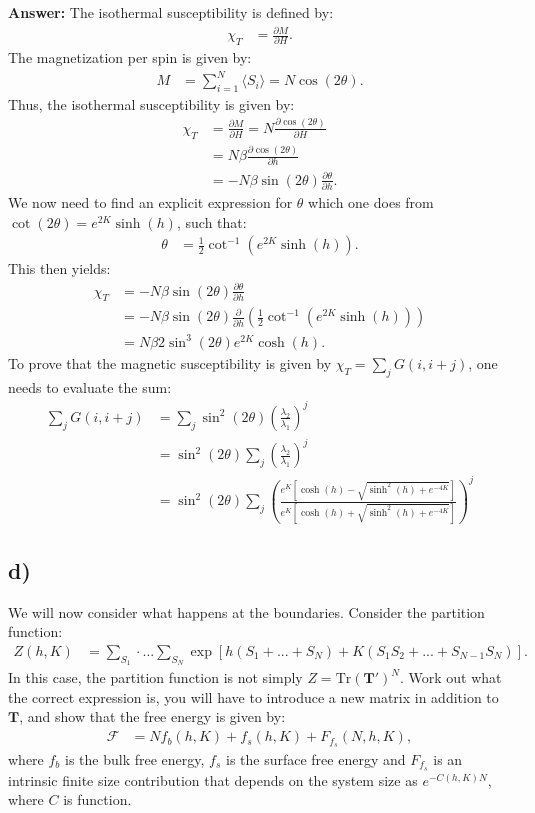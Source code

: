 \documentclass[a4paper]{article}
\newcommand{\trace}{\text{Tr}}
\newcommand{\newparagraph}{\vspace{.5cm}\noindent}
\newcommand{\fpartial}[2]{\frac{\partial #1}{\partial #2}}
\newcommand{\average}[1]{\langle #1 \rangle}
\begin{document}
\newparagraph
\textbf{Answer:} The isothermal susceptibility is defined by:
\begin{align*}
    \chi_T &= \fpartial{M}{H}.
\end{align*}The magnetization per spin is given by:
\begin{align*}
    M &= \sum_{i = 1}^N\average{S_i} = N\cos(2\theta).
\end{align*}Thus, the isothermal susceptibility is given by:
\begin{align*}
    \chi_T &= \fpartial{M}{H} = N\fpartial{\cos(2\theta)}{H}\\
    &= N\beta\fpartial{\cos(2\theta)}{h}\\
    &= -N\beta\sin(2\theta)\fpartial{\theta}{h}.
\end{align*}We now need to find an explicit expression for $\theta$ which one does from $\cot(2\theta) = e^{2K}\sinh(h)$, such that:
\begin{align*}
    \theta &= \frac{1}{2}\cot^{-1}\left(e^{2K}\sinh(h)\right).
\end{align*}This then yields:
\begin{align*}
    \chi_T &=-N\beta\sin(2\theta)\fpartial{\theta}{h}\\
    &= -N\beta\sin\left(2\theta\right)\fpartial{}{h}\left(\frac{1}{2}\cot^{-1}\left(e^{2K}\sinh(h)\right)\right)\\
    &= N\beta2\sin^3\left(2\theta\right)e^{2K}\cosh(h).
\end{align*}
To prove that the magnetic susceptibility is given by $\chi_T = \sum_j G(i, i+j)$, one needs to evaluate the sum:
\begin{align*}
    \sum_j G(i, i+j) &= \sum_j \sin^2\left(2\theta\right)\left(\frac{\lambda_2}{\lambda_1}\right)^j\\
    &= \sin^2\left(2\theta\right)\sum_j\left(\frac{\lambda_2}{\lambda_1}\right)^j\\
    &= \sin^2(2\theta)\sum_j\left(\frac{e^{K}\left[\cosh(h) - \sqrt{\sinh^2(h) + e^{-4K}}\right]}{e^{K}\left[\cosh(h) + \sqrt{\sinh^2(h) + e^{-4K}}\right]}\right)^j
\end{align*}


\subsection*{d)} 
We will now consider what happens at the boundaries. Consider the partition function:
\begin{align*}
    Z(h, K) &= \sum_{S_1}\cdot...\sum_{S_N} \exp\left[h\left(S_1 + ...+ S_N\right) + K\left(S_1S_2 + ... + S_{N-1}S_N\right)\right].
\end{align*}In this case, the partition function is not simply $Z = \trace\left(\mathbf{T}'\right)^N$.
Work out what the correct expression is, you will have to introduce a new matrix in addition to $\mathbf{T}$, and show that the free energy is given by:
\begin{align*}
    \mathcal{F} &= N f_b(h, K) + f_s(h, K) + F_{f_s}(N, h, K),
\end{align*}where $f_b$ is the bulk free energy, $f_s$ is the surface free energy and $F_{f_s}$ is an intrinsic finite size contribution that depends on the system size as $e^{-C(h, K)N}$, where $C$ is function.
\end{document}
